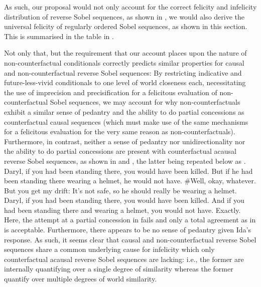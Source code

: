 As such, our proposal would not only account for the correct felicity and infelicity distribution of reverse Sobel sequences, as shown in , we would also derive the universal felicity of regularly ordered Sobel sequences, as shown in this section. This is summarised in the table in .
\begin{table}[!htb]
\end{table}
Not only that, but the requirement that our account places upon the nature of non-counterfactual conditionals correctly predicts similar properties for causal and non-counterfactual reverse Sobel sequences: By restricting indicative and future-less-vivid conditionals to one level of world closeness each, necessitating the use of imprecision and precisification for a felicitous evaluation of non-counterfactual Sobel sequences, we may account for why non-counterfactuals exhibit a similar sense of pedantry and the ability to do partial concessions as counterfactual causal sequences (which must make use of the same mechanisms for a felicitous evaluation for the very same reason as non-counterfactuals). Furthermore, in contrast, neither a sense of pedantry nor unidirectionality nor the ability to do partial concessions are present with counterfactual acausal reverse Sobel sequences, as shown in  and , the latter being repeated below as .
\pex{}%
			\a	{}Daryl, if you had been standing there, you would have been killed.
			\a	{}But if he had been standing there wearing a helmet, he would not have.
			\a	{}\#Well, okay, whatever. But you get my drift: It's not safe, so he should really be wearing a helmet.\hfill\parencite[adapted from][p.~139]{Klecha2015}
\xe
\pex{}%
			\a	{}Daryl, if you had been standing there, you would have been killed.
			\a	{}And if you had been standing there and wearing a helmet, you would not have.
			\a	{}Exactly.\hfill\parencite[p.~150]{Klecha2015}
\xe
Here, the attempt at a partial concession in  fails and only a total agreement as in  is acceptable. Furthermore, there appears to be no sense of pedantry given Ida's response. As such, it seems clear that causal and non-counterfactual reverse Sobel sequences share a common underlying cause for infelicity which only counterfactual acausal reverse Sobel sequences are lacking: i.e., the former are internally quantifying over a single degree of similarity whereas the former quantify over multiple degrees of world similarity.

